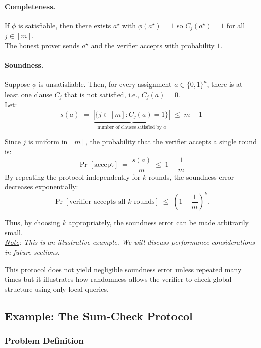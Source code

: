 \paragraph{Completeness.}
If $\phi$ is satisfiable, then there exists $a^\star$ with $\phi(a^\star)=1$ so $C_j(a^\star)=1$ for all $j\in[m]$. \\
\noindent The honest prover sends $a^\star$ and the verifier accepts with probability $1$.

\paragraph{Soundness.}
Suppose $\phi$ is unsatisfiable. Then, for every assignment $a \in \{0,1\}^n$, there is at least one clause $C_j$ that is not satisfied, i.e., $C_j(a) = 0$. \\

\noindent Let:
\[
s(a) \;=\; \underbrace{\left|\{j \in [m] : C_j(a) = 1\}\right|}_{\text{number of clauses satisfied by } a} \;\le\; m-1
\]

\noindent Since $j$ is uniform in $[m]$, the probability that the verifier accepts a single round is:
\[
\Pr[\text{accept}] \;=\; \frac{s(a)}{m} \;\le\; 1-\frac{1}{m}
\]
By repeating the protocol independently for $k$ rounds, the soundness error decreases exponentially:
\[
\Pr[\text{verifier accepts all $k$ rounds}] \;\le\; \left(1-\frac{1}{m}\right)^k.
\]

\noindent Thus, by choosing $k$ appropriately, the soundness error can be made arbitrarily small. \\

\noindent \textit{\underline{Note}: This is an illustrative example. We will discuss performance considerations in future sections.}

\myspace

\begin{remark}
    This protocol does not yield negligible soundness error unless repeated many times but it illustrates how randomness allows the verifier to check global structure using only local queries.
\end{remark}

\newpage

\subsection*{Example: The Sum-Check Protocol}

\subsubsection*{Problem Definition}

